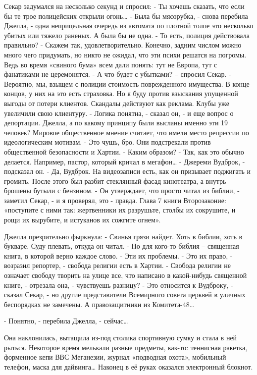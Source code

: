 \documentclass[10pt,final]{book}
\begin{document}
Секар задумался на несколько секунд и спросил:
- Ты хочешь сказать, что если бы те трое полицейских открыли огонь\ldots{}
- Была бы мясорубка, - снова перебила Джелла, - одна неприцельная очередь из автомата по плотной толпе это несколько убитых или тяжело раненых. А была бы не одна.
- То есть, полиция действовала правильно?
- Скажем так, удовлетворительно. Конечно, задним числом можно много чего придумать, но никто не ожидал, что эти психи решатся на погромы. Ведь во время «свиного бума» всем дали понять: тут не Европа, тут с фанатиками не церемонятся.
- А что будет с убытками? -- спросил Секар.
- Вероятно, мы, взыщем с полиции стоимость поврежденного имущества. В конце концов, у них на это есть страховка. Но я буду против взыскания упущенной выгоды от потери клиентов. Скандалы действуют как реклама. Клубы уже увеличили свою клиентуру.
- Логика понятна, - сказал он, - и еще вопрос о депортации. Джелла, а по какому принципу были высланы именно эти 19 человек? Мировое общественное мнение считает, что имели место репрессии по идеологическим мотивам.
- Это чушь, бро. Они подстрекали против общественной безопасности и Хартии.
- Каким образом?
- Так, как это обычно делается. Например, пастор, который кричал в мегафон\ldots{}
- Джереми Вудброк, - подсказал он.
- Да, Вудброк. На видеозаписи есть, как он призывает поджигать и громить. После этого был разбит стеклянный фасад кинотеатра, а внутрь брошены бутыли с бензином.
- Он утверждает, что просто читал из библии, - заметил Секар, - и я проверял, это - правда. Глава 7 книги Второзаконие: «поступите с ними так: жертвенники их разрушьте, столбы их сокрушите, и рощи их вырубите, и истуканов их сожгите огнем».

Джелла презрительно фыркнула:
- Свинья грязи найдет. Хоть в библии, хоть в букваре. Суду плевать, откуда он читал.
- Но для кого-то библия -- священная книга, в которой верно каждое слово.
- Эти их проблемы.
- Это их право, - возразил репортер, - свобода религии есть в Хартии.
- Свобода религии не означает свободу творить на улице все, что написано в какой-нибудь священной книге, - отрезала она, - чувствуешь разницу?
- Это относится к Вудброку, - сказал Секар, - но другие представители Всемирного совета церквей в уличных беспорядках не замечены. А правозащитники из Комитета-48\ldots{}

- Понятно, - перебила Джелла, - сейчас\ldots{}

Она наклонилась, вытащила из-под столика спортивную сумку и стала в ней рыться. Некоторое время мелькали разные предметы, как-то: теннисная ракетка, форменное кепи ВВС Меганезии, журнал «подводная охота», мобильный телефон, маска для дайвинга\ldots{} Наконец в её руках оказался электронный блокнот.
\end{document}
